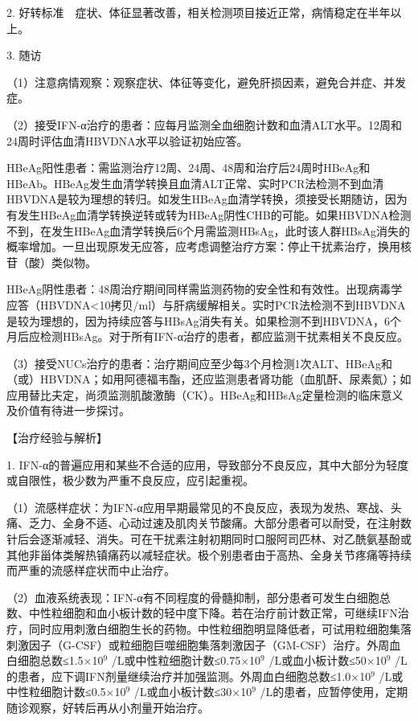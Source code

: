 2.
好转标准　症状、体征显著改善，相关检测项目接近正常，病情稳定在半年以上。

3. 随访

（1）注意病情观察：观察症状、体征等变化，避免肝损因素，避免合并症、并发症。

（2）接受IFN-α治疗的患者：应每月监测全血细胞计数和血清ALT水平。12周和24周时评估血清HBVDNA水平以验证初始应答。

HBeAg阳性患者：需监测治疗12周、24周、48周和治疗后24周时HBeAg和HBeAb。HBeAg发生血清学转换且血清ALT正常、实时PCR法检测不到血清HBVDNA是较为理想的转归。如发生HBeAg血清学转换，须接受长期随访，因为有发生HBeAg血清学转换逆转或转为HBeAg阴性CHB的可能。如果HBVDNA检测不到，在发生HBeAg血清学转换后6个月需监测HBsAg，此时该人群HBsAg消失的概率增加。一旦出现原发无应答，应考虑调整治疗方案：停止干扰素治疗，换用核苷（酸）类似物。

HBeAg阴性患者：48周治疗期间同样需监测药物的安全性和有效性。出现病毒学应答（HBVDNA\textless{}10拷贝/ml）与肝病缓解相关。实时PCR法检测不到HBVDNA是较为理想的，因为持续应答与HBsAg消失有关。如果检测不到HBVDNA，6个月后应检测HBsAg。对于所有IFN-α治疗的患者，都应监测干扰素相关不良反应。

（3）接受NUCs治疗的患者：治疗期间应至少每3个月检测1次ALT、HBeAg和（或）HBVDNA；如用阿德福韦酯，还应监测患者肾功能（血肌酐、尿素氮）；如应用替比夫定，尚须监测肌酸激酶（CK）。HBeAg和HBsAg定量检测的临床意义及价值有待进一步探讨。

【治疗经验与解析】

1.
IFN-α的普遍应用和某些不合适的应用，导致部分不良反应，其中大部分为轻度或自限性，极少数为严重不良反应，应引起重视。

（1）流感样症状：为IFN-α应用早期最常见的不良反应，表现为发热、寒战、头痛、乏力、全身不适、心动过速及肌肉关节酸痛。大部分患者可以耐受，在注射数针后会逐渐减轻、消失。可在干扰素注射初期同时口服阿司匹林、对乙酰氨基酚或其他非甾体类解热镇痛药以减轻症状。极个别患者由于高热、全身关节疼痛等持续而严重的流感样症状而中止治疗。

（2）血液系统表现：IFN-α有不同程度的骨髓抑制，部分患者可发生白细胞总数、中性粒细胞和血小板计数的轻中度下降。若在治疗前计数正常，可继续IFN治疗，同时应用刺激白细胞生长的药物。中性粒细胞明显降低者，可试用粒细胞集落刺激因子（G-CSF）或粒细胞巨噬细胞集落刺激因子（GM-CSF）治疗。外周血白细胞总数≤1.5×10$^{9}$
/L或中性粒细胞计数≤0.75×10$^{9}$ /L或血小板计数≤50×10$^{9}$
/L的患者，应下调IFN剂量继续治疗并加强监测。外周血白细胞总数≤1.0×10$^{9}$
/L或中性粒细胞计数≤0.5×10$^{9}$ /L或血小板计数≤30×10$^{9}$
/L的患者，应暂停使用，定期随诊观察，好转后再从小剂量开始治疗。

